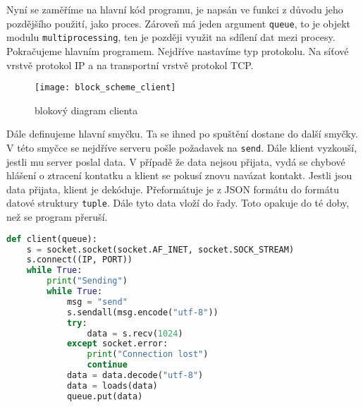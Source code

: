\documentclass[12pt]{report}			%
\begin{document}
Nyní se zaměříme na hlavní kód programu, je napsán ve funkci z důvodu jeho pozdějšího použití, jako proces. Zároveň má jeden argument \texttt{queue}, to je objekt modulu \texttt{multiprocessing}, ten je později využit na sdílení dat mezi procesy. Pokračujeme hlavním programem. Nejdříve nastavíme typ protokolu. Na síťové vrstvě protokol IP a na transportní vrstvě protokol TCP. 


\begin{figure}[h]
\caption{blokový diagram clienta}
\centering
 \texttt{[image: block\_scheme\_client]}
\end{figure}

Dále definujeme hlavní smyčku. Ta se ihned po spuštění dostane do další smyčky. V této smyčce se nejdříve serveru pošle požadavek na \texttt{send}. Dále klient vyzkouší, jestli mu server poslal data. V případě že data nejsou přijata, vydá se chybové hlášení o ztracení kontatku a klient se pokusí znovu navázat kontakt. Jestli jsou data přijata, klient je dekóduje. Přeformátuje je z JSON formátu do formátu datové struktury \texttt{tuple}. Dále tyto data vloží do řady. Toto opakuje do té doby, než se program přeruší. 

\begin{lstlisting}[title={Program client.py}, caption={client.py}, language=Python]
def client(queue):
    s = socket.socket(socket.AF_INET, socket.SOCK_STREAM)
    s.connect((IP, PORT))
    while True:
        print("Sending")
        while True:
            msg = "send"
            s.sendall(msg.encode("utf-8"))
            try:
                data = s.recv(1024)
            except socket.error:
                print("Connection lost")
                continue
            data = data.decode("utf-8")
            data = loads(data)
            queue.put(data)

\end{lstlisting}
\end{document}
